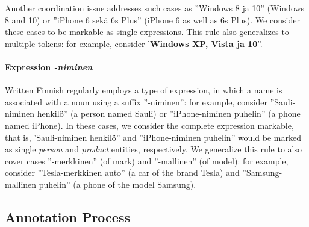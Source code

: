 \documentclass[11pt]{article}
\begin{document}
Another coordination issue addresses such cases as ''Windows 8 ja 10'' (Windows 8 and 10) or ''iPhone 6 sek\"a 6s Plus'' (iPhone 6 as well as 6s Plus). We consider these cases to be markable as single expressions. %
This rule also generalizes to multiple tokens: for example, consider '\textbf{Windows XP, Vista ja 10}''.

\paragraph{Expression \textit{-niminen}}
	
Written Finnish regularly employs a type of expression, in which a name is associated with a noun using a suffix ''-niminen'': for example, consider ''Sauli-niminen henkil\"o'' (a person named Sauli) or ''iPhone-niminen puhelin'' (a phone named iPhone). In these cases, we consider the complete expression markable, that is, 'Sauli-niminen henkil\"o'' and ''iPhone-niminen puhelin'' would be marked as single \textit{person} and \textit{product} entities, respectively. We generalize this rule to also cover cases ''-merkkinen'' (of mark) and ''-mallinen'' (of model): for example, consider ''Tesla-merkkinen auto'' (a car of the brand Tesla) and ''Samsung-mallinen puhelin'' (a phone of the model Samsung). 


\subsection{Annotation Process}

\end{document}
